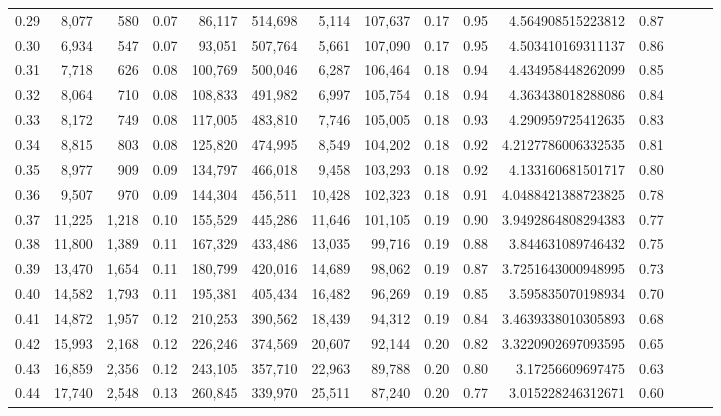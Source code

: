 \begin{tabular}{rrrrrrrrrrrrrrr}
0.29 &   8,077 &    580 &  0.07 &   86,117 &  514,698 &    5,114 &  107,637 &  0.17 &  0.95 &       4.564908515223812 &      0.87 \\
0.30 &   6,934 &    547 &  0.07 &   93,051 &  507,764 &    5,661 &  107,090 &  0.17 &  0.95 &       4.503410169311137 &      0.86 \\
0.31 &   7,718 &    626 &  0.08 &  100,769 &  500,046 &    6,287 &  106,464 &  0.18 &  0.94 &       4.434958448262099 &      0.85 \\
0.32 &   8,064 &    710 &  0.08 &  108,833 &  491,982 &    6,997 &  105,754 &  0.18 &  0.94 &       4.363438018288086 &      0.84 \\
0.33 &   8,172 &    749 &  0.08 &  117,005 &  483,810 &    7,746 &  105,005 &  0.18 &  0.93 &       4.290959725412635 &      0.83 \\
0.34 &   8,815 &    803 &  0.08 &  125,820 &  474,995 &    8,549 &  104,202 &  0.18 &  0.92 &      4.2127786006332535 &      0.81 \\
0.35 &   8,977 &    909 &  0.09 &  134,797 &  466,018 &    9,458 &  103,293 &  0.18 &  0.92 &       4.133160681501717 &      0.80 \\
0.36 &   9,507 &    970 &  0.09 &  144,304 &  456,511 &   10,428 &  102,323 &  0.18 &  0.91 &      4.0488421388723825 &      0.78 \\
0.37 &  11,225 &  1,218 &  0.10 &  155,529 &  445,286 &   11,646 &  101,105 &  0.19 &  0.90 &      3.9492864808294383 &      0.77 \\
0.38 &  11,800 &  1,389 &  0.11 &  167,329 &  433,486 &   13,035 &   99,716 &  0.19 &  0.88 &       3.844631089746432 &      0.75 \\
0.39 &  13,470 &  1,654 &  0.11 &  180,799 &  420,016 &   14,689 &   98,062 &  0.19 &  0.87 &      3.7251643000948995 &      0.73 \\
0.40 &  14,582 &  1,793 &  0.11 &  195,381 &  405,434 &   16,482 &   96,269 &  0.19 &  0.85 &       3.595835070198934 &      0.70 \\
0.41 &  14,872 &  1,957 &  0.12 &  210,253 &  390,562 &   18,439 &   94,312 &  0.19 &  0.84 &      3.4639338010305893 &      0.68 \\
0.42 &  15,993 &  2,168 &  0.12 &  226,246 &  374,569 &   20,607 &   92,144 &  0.20 &  0.82 &      3.3220902697093595 &      0.65 \\
0.43 &  16,859 &  2,356 &  0.12 &  243,105 &  357,710 &   22,963 &   89,788 &  0.20 &  0.80 &        3.17256609697475 &      0.63 \\
0.44 &  17,740 &  2,548 &  0.13 &  260,845 &  339,970 &   25,511 &   87,240 &  0.20 &  0.77 &       3.015228246312671 &      0.60 \\

\end{tabular}
